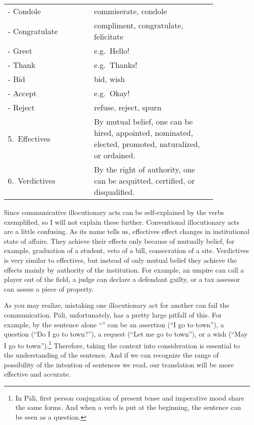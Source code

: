 \begin{longtable}[c]{@{}%
	>{\raggedright\arraybackslash}p{0.35\linewidth}%
	>{\raggedright\arraybackslash}p{0.5\linewidth}%
	@{}}
\hspace{5mm}- Condole & commiserate, condole \\
\hspace{5mm}- Congratulate & compliment, congratulate, felicitate \\
\hspace{5mm}- Greet & e.g.\ Hello! \\
\hspace{5mm}- Thank & e.g.\ Thanks! \\
\hspace{5mm}- Bid & bid, wish \\
\hspace{5mm}- Accept & e.g.\ Okay! \\
\hspace{5mm}- Reject & refuse, reject, spurn \\
\midrule
\mbox{5. Effectives} & By mutual belief, one can be hired, appointed, nominated, elected, promoted, naturalized, or ordained. \\
\midrule
\mbox{6. Verdictives} & By the right of authority, one can be acquitted, certified, or disqualified.\\
\end{longtable}

Since communicative illocutionary acts can be self-explained by the verbs exemplified, so I will not explain these further. Conventional illocutionary acts are a little confusing. As its name tells us, effectives effect changes in institutional state of affairs. They achieve their effects only because of mutually belief, for example, graduation of a student, veto of a bill, consecration of a site. Verdictives is very similar to effectives, but instead of only mutual belief they achieve the effects mainly by authority of the institution. For example, an umpire can call a player out of the field, a judge can declare a defendant guilty, or a tax assessor can assess a piece of property.

As you may realize, mistaking one illocutionary act for another can fail the communication. P\=ali, unfortunately, has a pretty large pitfall of this. For example, by the sentence alone ``'' can be an assertion (``I go to town''), a question (``Do I go to town?''), a request (``Let me go to town''), or a wish (``May I go to town'').\footnote{In P\=ali, first person conjugation of present tense and imperative mood share the same forms. And when a verb is put at the beginning, the sentence can be seen as a question.} Therefore, taking the context into consideration is essential to the understanding of the sentence. And if we can recognize the range of possibility of the intention of sentences we read, our translation will be more effective and accurate.
